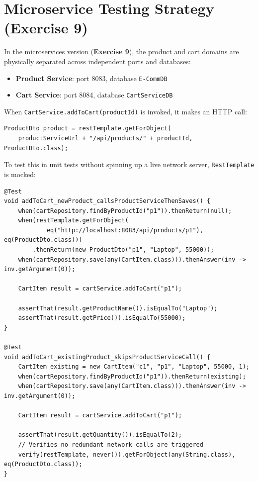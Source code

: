 \documentclass[12pt,a4paper]{article}
\begin{document}
\section{Microservice Testing Strategy (Exercise 9)}

In the microservices version (\textbf{Exercise 9}), the product and cart domains are physically separated across independent ports and databases:
\begin{itemize}[leftmargin=2em]
  \item \textbf{Product Service}: port 8083, database \texttt{E-CommDB}
  \item \textbf{Cart Service}: port 8084, database \texttt{CartServiceDB}
\end{itemize}

When \texttt{CartService.addToCart(productId)} is invoked, it makes an HTTP call:
\begin{lstlisting}[style=javastyle]
ProductDto product = restTemplate.getForObject(
    productServiceUrl + "/api/products/" + productId, ProductDto.class);
\end{lstlisting}

To test this in unit tests without spinning up a live network server, \texttt{RestTemplate} is mocked:
\begin{lstlisting}[style=javastyle, caption={Mocking RestTemplate in Exercise 9 CartServiceTest}]
@Test
void addToCart_newProduct_callsProductServiceThenSaves() {
    when(cartRepository.findByProductId("p1")).thenReturn(null);
    when(restTemplate.getForObject(
            eq("http://localhost:8083/api/products/p1"), eq(ProductDto.class)))
        .thenReturn(new ProductDto("p1", "Laptop", 55000));
    when(cartRepository.save(any(CartItem.class))).thenAnswer(inv -> inv.getArgument(0));

    CartItem result = cartService.addToCart("p1");

    assertThat(result.getProductName()).isEqualTo("Laptop");
    assertThat(result.getPrice()).isEqualTo(55000);
}

@Test
void addToCart_existingProduct_skipsProductServiceCall() {
    CartItem existing = new CartItem("c1", "p1", "Laptop", 55000, 1);
    when(cartRepository.findByProductId("p1")).thenReturn(existing);
    when(cartRepository.save(any(CartItem.class))).thenAnswer(inv -> inv.getArgument(0));

    CartItem result = cartService.addToCart("p1");

    assertThat(result.getQuantity()).isEqualTo(2);
    // Verifies no redundant network calls are triggered
    verify(restTemplate, never()).getForObject(any(String.class), eq(ProductDto.class));
}
\end{lstlisting}
\end{document}
